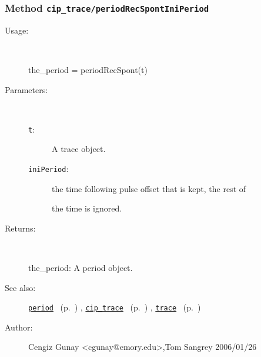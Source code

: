 \subsubsection[Method \texttt{periodRecSpontIniPeriod}]{Method \texttt{cip\_trace/periodRecSpontIniPeriod}}%
%
\label{ref_cip_trace__periodRecSpontIniPeriod}%
\hypertarget{ref_cip_trace__periodRecSpontIniPeriod}{}%
\begin{description}
%
\item[Usage:]~%
\begin{lyxcode}%
the\_period = periodRecSpont(t)
%
\end{lyxcode}%
%
%
\item[Parameters:]~
\begin{description}%
\item[\texttt{t}:]
 A trace object.
\item[\texttt{iniPeriod}:]
 the time following pulse offset that is kept, the rest of

the time is ignored.\end{description}%
%
\item[Returns:]~

	the\_period: A period object.
%
%
\item[See also:]%
\hyperlink{ref_period}{\texttt{period}}%
\ (p.~\pageref{ref_period})%
%
, \hyperlink{ref_cip_trace}{\texttt{cip\_trace}}%
\ (p.~\pageref{ref_cip_trace})%
%
, \hyperlink{ref_trace}{\texttt{trace}}%
\ (p.~\pageref{ref_trace})%
%
%
\item[Author:]%
Cengiz Gunay <cgunay@emory.edu>,Tom Sangrey 2006/01/26%
\end{description}
\methodline%
